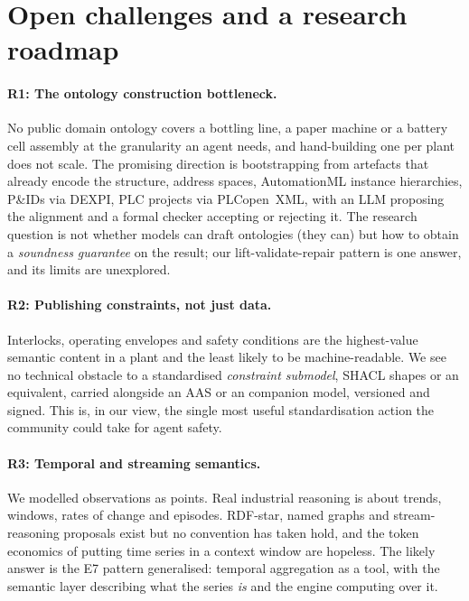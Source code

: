 \section{Open challenges and a research roadmap}
\label{sec:challenges}

\paragraph{R1: The ontology construction bottleneck.} No public domain
ontology covers a bottling line, a paper machine or a battery cell assembly at
the granularity an agent needs, and hand-building one per plant does not scale.
The promising direction is bootstrapping from artefacts that already encode the
structure, \opcua{} address spaces, AutomationML instance hierarchies, P\&IDs
via DEXPI, PLC projects via PLCopen~XML, with an LLM proposing the alignment
and a formal checker accepting or rejecting it. The research question is not
whether models can draft ontologies (they can) but how to obtain a
\emph{soundness guarantee} on the result; our lift-validate-repair pattern is
one answer, and its limits are unexplored.

\paragraph{R2: Publishing constraints, not just data.} Interlocks, operating
envelopes and safety conditions are the highest-value semantic content in a plant
and the least likely to be machine-readable. We see no technical obstacle to a
standardised \emph{constraint submodel}, SHACL shapes or an equivalent, carried
alongside an AAS or an \opcua{} companion model, versioned and signed. This is,
in our view, the single most useful standardisation action the community could
take for agent safety.

\paragraph{R3: Temporal and streaming semantics.} We modelled observations as
points. Real industrial reasoning is about trends, windows, rates of change and
episodes. RDF-star, named graphs and stream-reasoning proposals exist but no
convention has taken hold, and the token economics of putting time series in a
context window are hopeless. The likely answer is the E7 pattern generalised:
temporal aggregation as a tool, with the semantic layer describing what the
series \emph{is} and the engine computing over it.

